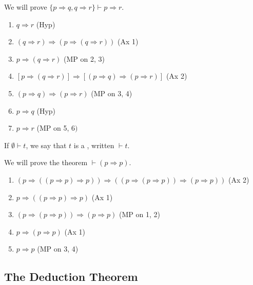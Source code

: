 \documentclass[a4paper, 10pt, twocolumn]{amsart}
\begin{document}
\begin{example}
  We will prove $\{p\Rightarrow q, q \Rightarrow r\} \vdash p \Rightarrow r$.

  \begin{enumerate}
    \item $q \Rightarrow r$ \hfill (Hyp)
    \item $(q \Rightarrow r) \Rightarrow(p \Rightarrow(q \Rightarrow r))$ \hfill (Ax 1)
    \item $p \Rightarrow(q \Rightarrow r)$ \hfill (MP on 2, 3)
    \item $[p \Rightarrow(q \Rightarrow r)] \Rightarrow[(p \Rightarrow q) \Rightarrow(p \Rightarrow r)]$ \hfill (Ax 2)
    \item $(p \Rightarrow q) \Rightarrow(p \Rightarrow r)$ \hfill (MP on 3, 4)
    \item $p \Rightarrow q$ \hfill (Hyp)
    \item $p \Rightarrow r$ \hfill (MP on 5, 6$)$
  \end{enumerate}
\end{example}

\begin{definition}[Theorem]
  If $\emptyset \vdash t$, we say that $t$ is a , written $\vdash t$.
\end{definition}

\begin{example}
  We will prove the theorem $\vdash (p \Rightarrow p)$.

  \begin{enumerate}
    \item $(p \Rightarrow((p \Rightarrow p) \Rightarrow p)) \Rightarrow((p \Rightarrow(p \Rightarrow p)) \Rightarrow(p \Rightarrow p))$ \hfill(Ax 2)
    \item $p \Rightarrow((p \Rightarrow p) \Rightarrow p)$ \hfill(Ax 1)
    \item $(p \Rightarrow(p \Rightarrow p)) \Rightarrow(p \Rightarrow p)$ \hfill(MP on 1, 2)
    \item $p \Rightarrow(p \Rightarrow p)$ \hfill(Ax 1)
    \item $p \Rightarrow p$ \hfill(MP on 3, 4)
  \end{enumerate}
\end{example}

\subsection{The Deduction Theorem}
\end{document}
